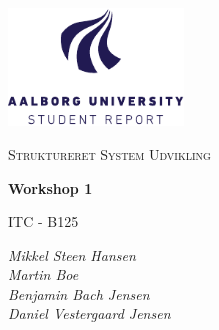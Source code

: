 \begin{titlepage}
    \centering
	\includegraphics[width=0.35\textwidth]{Projectdoc/Assets/Illustrationer/aau_logo_en.pdf}\par\vspace{1cm}
	{\scshape\Large Struktureret System Udvikling\par}
	\vspace{0.2cm}
	{\huge\bfseries Workshop 1\par}
	\vspace{0.2cm}
	{\scshape\Large ITC - B125\par}
	\vspace{2cm}
	{\Large\itshape 
    	Mikkel Steen Hansen\\
        Martin Boe\\
        Benjamin Bach Jensen\\
        Daniel Vestergaard Jensen\\
    \par}
	\vfill
	\vfill
\end{titlepage}